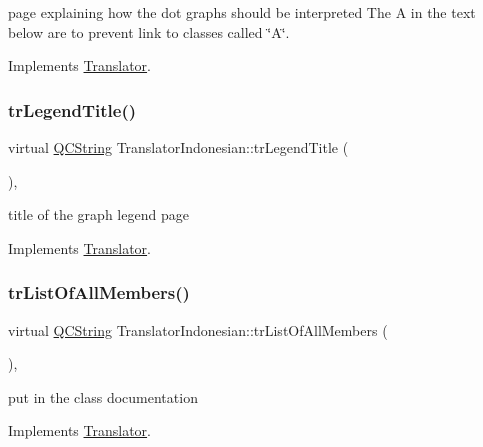 page explaining how the dot graph\textquotesingle{}s should be interpreted The A in the text below are to prevent link to classes called \char`\"{}\+A\char`\"{}. 

Implements \mbox{\hyperlink{class_translator}{Translator}}.

\mbox{\label{class_translator_indonesian_a3d4a79ecb3cbbf5802f32515e850618c}} 
\subsubsection{\texorpdfstring{trLegendTitle()}{trLegendTitle()}}
{\footnotesize\ttfamily virtual \mbox{\hyperlink{class_q_c_string}{Q\+C\+String}} Translator\+Indonesian\+::tr\+Legend\+Title (\begin{DoxyParamCaption}{ }\end{DoxyParamCaption})\hspace{0.3cm}{\ttfamily [inline]}, {\ttfamily [virtual]}}

title of the graph legend page 

Implements \mbox{\hyperlink{class_translator}{Translator}}.

\mbox{\label{class_translator_indonesian_aefb6a631ffcb9092d6006e2c87f75595}} 
\subsubsection{\texorpdfstring{trListOfAllMembers()}{trListOfAllMembers()}}
{\footnotesize\ttfamily virtual \mbox{\hyperlink{class_q_c_string}{Q\+C\+String}} Translator\+Indonesian\+::tr\+List\+Of\+All\+Members (\begin{DoxyParamCaption}{ }\end{DoxyParamCaption})\hspace{0.3cm}{\ttfamily [inline]}, {\ttfamily [virtual]}}

put in the class documentation 

Implements \mbox{\hyperlink{class_translator}{Translator}}.

\mbox{\label{class_translator_indonesian_a1e19f2b2373ba892c82929021c91ecd6}} 
